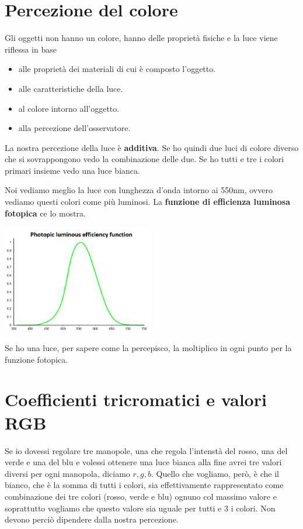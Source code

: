 \section{Percezione del colore}
Gli oggetti non hanno un colore, hanno delle propriet\`a fisiche e la luce viene riflessa in
base
\begin{itemize}
	\item alle propriet\`a dei materiali di cui \`e composto l'oggetto.
	\item alle caratteristiche della luce.
	\item al colore intorno all'oggetto.
	\item alla percezione dell'osservatore.
\end{itemize}
La nostra percezione della luce \`e \textbf{additiva}. Se ho quindi due luci di colore diverso
che si sovrappongono vedo la combinazione delle due. Se ho tutti e tre i colori primari insieme
vedo una luce bianca.

Noi vediamo meglio la luce con lunghezza d'onda intorno ai 550nm, ovvero vediamo questi colori
come pi\`u luminosi. La \textbf{funzione di efficienza luminosa fotopica} ce lo mostra.
\begin{center}
	\includegraphics[width=0.5\textwidth]{Immagini/Funzione fotopica}
\end{center}
Se ho una luce, per sapere come la percepisco, la moltiplico in ogni punto per la funzione
fotopica.

\section{Coefficienti tricromatici e valori RGB}
Se io dovessi regolare tre manopole, una che regola l'intenst\`a del rosso, una del verde e
una del blu e volessi ottenere una luce bianca alla fine avrei tre valori diversi per ogni
manopola, diciamo $r, g, b$. Quello che vogliamo, per\`o, \`e che il bianco, che \`e la somma
di tutti i colori, sia effettivamente rappresentato come combinazione dei tre colori (rosso,
verde e blu) ognuno col massimo valore e soprattutto vogliamo che questo valore sia uguale
per tutti e 3 i colori. Non devono perci\`o dipendere dalla nostra percezione.

